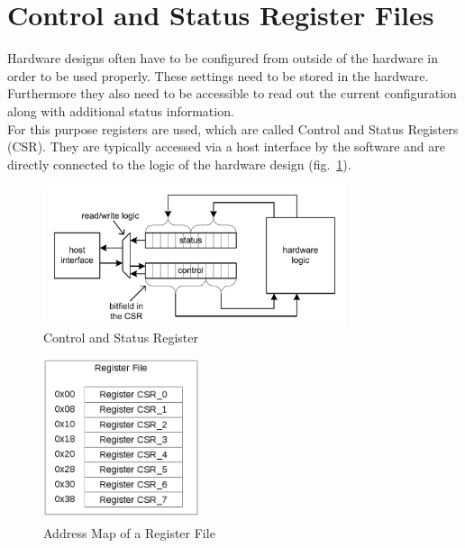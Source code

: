 \section{Control and Status Register Files}
Hardware designs often have to be configured from outside of the hardware in order to be used properly. These settings need to be stored in the hardware. Furthermore they also need to be accessible to read out the current configuration along with additional status information.\\
For this purpose registers are used, which are called Control and Status Registers (CSR). They are typically accessed via a host interface by the software and are directly connected to the logic of the hardware design (fig.~\ref{fig:csr}).
\begin{figure}[h]
 \centering
 \includegraphics[width=252pt]{images/csr.png}
 \caption{Control and Status Register \cite{leber_diss}}
\label{fig:csr}
\end{figure}

\begin{figure}[h]
 \centering
 \includegraphics[width=130pt]{images/rf.png}
 \caption{Address Map of a Register File}
\label{fig:rf}
\end{figure}
